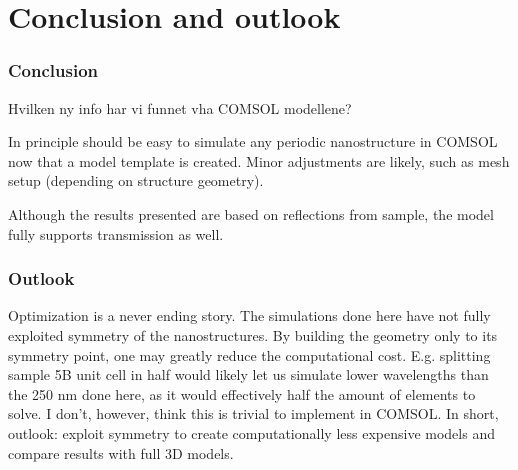 
\chapter{Conclusion and outlook}

\subsection*{Conclusion}

Hvilken ny info har vi funnet vha COMSOL modellene?

In principle should be easy to simulate any periodic nanostructure in COMSOL now that a model template is created. Minor adjustments are likely, such as mesh setup (depending on structure geometry).

Although the results presented are based on reflections from sample, the model fully supports transmission as well.

\subsection*{Outlook}
Optimization is a never ending story. The simulations done here have not fully exploited symmetry of the nanostructures. By building the geometry only to its symmetry point, one may greatly reduce the computational cost. E.g. splitting sample 5B unit cell in half would likely let us simulate lower wavelengths than the 250 nm done here, as it would effectively half the amount of elements to solve. I don't, however, think this is trivial to implement in COMSOL. In short, outlook: exploit symmetry to create computationally less expensive models and compare results with full 3D models.



\cleardoublepage